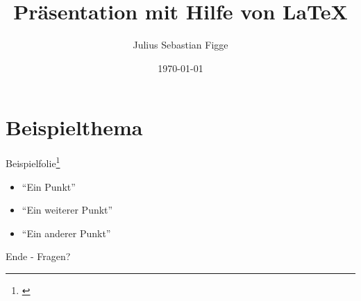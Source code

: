 \documentclass[xcolor=dvipsnames,11pt]{beamer}
\author{Julius Sebastian Figge}
\title[FHDW Präsentation Template]{Präsentation mit Hilfe von \LaTeX}
\date{\today}
\begin{document}
\begin{frame}
\titlepage
\end{frame}

\frame{\tableofcontents}

\section{Beispielthema}

\begin{frame}{Beispielfolie\footnote{\cite{ExampleEntry}}}
\begin{itemize}
	\item \enquote{Ein Punkt} 
	\item \enquote{Ein weiterer Punkt} 
	\item \enquote{Ein anderer Punkt} 
\end{itemize}
\end{frame}

\begin{frame}
\center \huge Ende - Fragen?
\end{frame}
\end{document}
